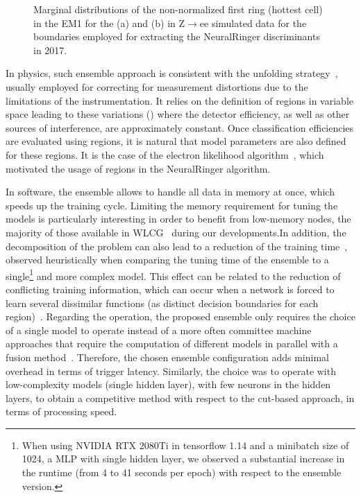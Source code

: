 \begin{figure}[h!t]
\caption{Marginal distributions of the non-normalized first ring (hottest cell)
in the EM1 for the \et (a) and  \abseta (b) in Z$\rightarrow$ee simulated data
for the boundaries employed for extracting the NeuralRinger discriminants in 2017.}%
\label{fig:ring_distortion}
\end{figure}

In physics, such ensemble approach is consistent with the unfolding
strategy~\cite{Cowan1998}, usually employed for correcting for
measurement distortions due to the limitations of the instrumentation. It relies
on the definition of regions in variable space leading to these
variations (\eteta{}) where the detector efficiency, as well as other
sources of interference, are approximately constant. Once classification
efficiencies are evaluated using regions, it is natural that model parameters
are also defined for these regions. It is the case of the electron likelihood
algorithm~\cite{atlas_electron_id_offline}, which motivated the usage of
\eteta{} regions in the NeuralRinger algorithm.

In software, the ensemble allows to handle all data in memory at once,
which speeds up the training cycle. Limiting the memory requirement for tuning
the models is particularly interesting in order to benefit from low-memory
nodes, the majority of those available in WLCG~\cite{2015_lcg_tdr} during our
developments.\@ In addition, the decomposition of the problem can also lead to a
reduction of the training time~\cite{Polikar2006}, observed heuristically when
comparing the tuning time of the ensemble to a single\footnote{
  When using NVIDIA RTX 2080Ti in tensorflow 1.14 and a minibatch size of 1024, a 
  MLP with single hidden layer, we observed a substantial increase in the runtime (from 4 
  to 41 seconds per epoch) with respect to the ensemble version.
} and more complex model.
This effect can be related to the reduction of conflicting training information,
which can occur when a network is forced to learn several dissimilar functions
(as distinct decision boundaries for each region)~\cite{Auda1999,haykin_2008}.
Regarding the operation, the proposed ensemble only requires the choice of a
single model to operate instead of a more often committee machine approaches
that require the computation of different models in parallel with a fusion
method~\cite{zhou_ensemble}.  Therefore, the chosen ensemble configuration adds
minimal overhead in terms of trigger latency. Similarly, the choice was to
operate with low-complexity models (single hidden layer), with few neurons in
the hidden layers, to obtain a competitive method with respect to the cut-based
approach, in terms of processing speed.



